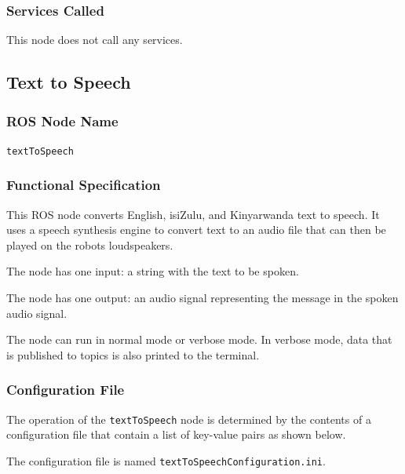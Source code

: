 \documentclass{CSSRforAfrica}
\begin{document}
{{\subsubsection*{Services Called}
This node does not call any services.








\newpage

\subsection{Text to Speech }

\subsubsection*{ROS Node Name}
 {\small \verb+textToSpeech+}   

\subsubsection*{Functional Specification}
This ROS node converts English, isiZulu, and Kinyarwanda text to speech.  It uses a speech synthesis engine to convert text to an audio file that can then be played on the robots loudspeakers.     

The node has one input: a string with the text to be spoken.  
 
The node has one output: an audio signal representing the message in the spoken audio signal. 

The node can run in normal mode or verbose mode. In verbose mode, data that is published to topics is also printed to the terminal.

\subsubsection*{Configuration File}

The operation of the {\small \verb+textToSpeech+} node is determined by the contents of a configuration file that  contain a list of key-value pairs as shown below.  

\noindent The configuration file is named {\small \verb+textToSpeechConfiguration.ini+}.


}}
\end{document}
